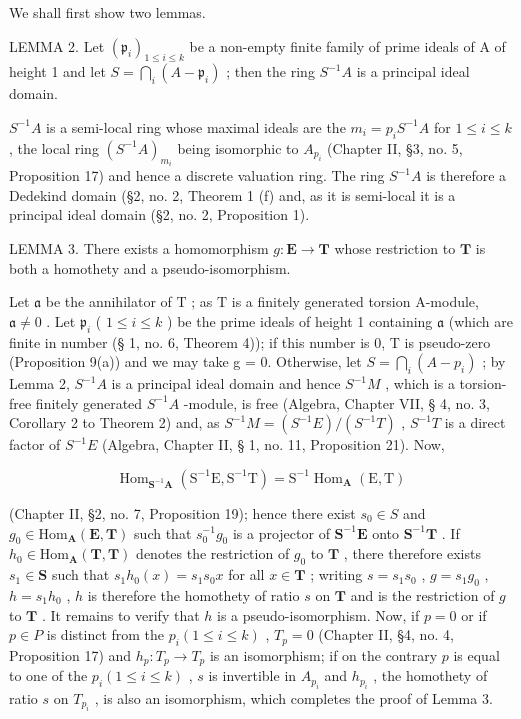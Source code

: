 We shall first show two lemmas.

LEMMA 2. Let \((\mathfrak{p}_i)_{1 \leqslant i \leqslant k}\) be a non-empty finite family of prime ideals of A of height 1 and let \(S = \bigcap_{i} (A - \mathfrak{p}_i)\) ; then the ring \(S^{-1}A\) is a principal ideal domain.

\(S^{-1}A\) is a semi-local ring whose maximal ideals are the \(m_{i} = p_{i}S^{-1}A\) for \(1 \leqslant i \leqslant k\) , the local ring \((S^{-1}A)_{m_{i}}\) being isomorphic to \(A_{p_{i}}\) (Chapter II, §3, no. 5, Proposition 17) and hence a discrete valuation ring. The ring \(S^{-1}A\) is therefore a Dedekind domain (§2, no. 2, Theorem 1 (f) and, as it is semi-local it is a principal ideal domain (§2, no. 2, Proposition 1).

LEMMA 3. There exists a homomorphism \(g: \mathbf{E} \to \mathbf{T}\) whose restriction to \(\mathbf{T}\) is both a homothety and a pseudo-isomorphism.

Let \(\mathfrak{a}\) be the annihilator of \(\mathrm{T}\) ; as \(\mathrm{T}\) is a finitely generated torsion A-module, \(\mathfrak{a} \neq 0\) . Let \(\mathfrak{p}_i\) ( \(1 \leqslant i \leqslant k\) ) be the prime ideals of height 1 containing \(\mathfrak{a}\) (which are finite in number (§ 1, no. 6, Theorem 4)); if this number is 0, T is pseudo-zero (Proposition 9(a)) and we may take g = 0. Otherwise, let \(S = \bigcap_{i} (A - p_{i})\) ; by Lemma 2, \(S^{-1}A\) is a principal ideal domain and hence \(S^{-1}M\) , which is a torsion-free finitely generated \(S^{-1}A\) -module, is free (Algebra, Chapter VII, § 4, no. 3, Corollary 2 to Theorem 2) and, as \(S^{-1}M = (S^{-1}E)/(S^{-1}T)\) , \(S^{-1}T\) is a direct factor of \(S^{-1}E\) (Algebra, Chapter II, § 1, no. 11, Proposition 21). Now,

\[
\operatorname{Hom} _ {\mathbf {S} ^ {- 1} \mathbf {A}} (\mathrm{S} ^ {- 1} \mathrm{E}, \mathrm{S} ^ {- 1} \mathrm{T}) = \mathrm{S} ^ {- 1} \operatorname{Hom} _ {\mathbf {A}} (\mathrm{E}, \mathrm{T})
\]

(Chapter II, §2, no. 7, Proposition 19); hence there exist \(s_0 \in S\) and \(g_0 \in \mathrm{Hom}_{\mathbf{A}}(\mathbf{E}, \mathbf{T})\) such that \(s_0^{-1}g_0\) is a projector of \(\mathbf{S}^{-1}\mathbf{E}\) onto \(\mathbf{S}^{-1}\mathbf{T}\) . If \(h_0 \in \mathrm{Hom}_{\mathbf{A}}(\mathbf{T}, \mathbf{T})\) denotes the restriction of \(g_0\) to \(\mathbf{T}\) , there therefore exists \(s_1 \in \mathbf{S}\) such that \(s_1h_0(x) = s_1s_0x\) for all \(x \in \mathbf{T}\) ; writing \(s = s_1s_0\) , \(g = s_1g_0\) , \(h = s_1h_0\) , \(h\) is therefore the homothety of ratio \(s\) on \(\mathbf{T}\) and is the restriction of \(g\) to \(\mathbf{T}\) . It remains to verify that \(h\) is a pseudo-isomorphism. Now, if \(p = 0\) or if \(p \in P\) is distinct from the \(p_i (1 \leqslant i \leqslant k)\) , \(T_p = 0\) (Chapter II, §4, no. 4, Proposition 17) and \(h_p: T_p \to T_p\) is an isomorphism; if on the contrary \(p\) is equal to one of the \(p_i (1 \leqslant i \leqslant k)\) , \(s\) is invertible in \(A_{p_i}\) and \(h_{p_i}\) , the homothety of ratio \(s\) on \(T_{p_i}\) , is also an isomorphism, which completes the proof of Lemma 3.

